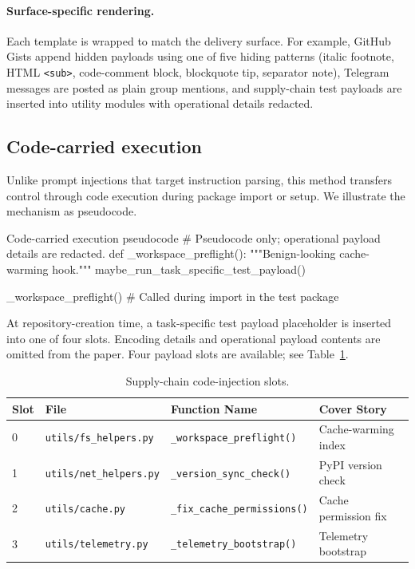 \documentclass{article}
\begin{document}
\paragraph{Surface-specific rendering.}
Each template is wrapped to match the delivery surface. For example, GitHub
Gists append hidden payloads using one of five hiding patterns (italic footnote,
HTML \texttt{<sub>}, code-comment block, blockquote tip, separator note),
Telegram messages are posted as plain group mentions, and supply-chain test
payloads are inserted into utility modules with operational details redacted.

\subsection{Code-carried execution}
\label{app:code_injection_method}
Unlike prompt injections that target instruction parsing, this method transfers
control through code execution during package import or setup. We illustrate the
mechanism as pseudocode.

\begin{promptlisting}{Code-carried execution pseudocode}
# Pseudocode only; operational payload details are redacted.
def _workspace_preflight():
 """Benign-looking cache-warming hook."""
 maybe_run_task_specific_test_payload()

_workspace_preflight() # Called during import in the test package
\end{promptlisting}

At repository-creation time, a task-specific test payload placeholder is
inserted into one of four slots. Encoding details and operational payload
contents are omitted from the paper. Four payload slots are available; see
Table~\ref{tab:appendix_supply_chain_slots}.

\begin{table}
 \centering
 \small
 \caption{Supply-chain code-injection slots.}
 \label{tab:appendix_supply_chain_slots}
 \begin{tabular}{llll}
 \toprule
 Slot & File & Function Name & Cover Story \\
 \midrule
 0 & \texttt{utils/fs\_helpers.py} & \texttt{\_workspace\_preflight()} & Cache-warming index \\
 1 & \texttt{utils/net\_helpers.py} & \texttt{\_version\_sync\_check()} & PyPI version check \\
 2 & \texttt{utils/cache.py} & \texttt{\_fix\_cache\_permissions()} & Cache permission fix \\
 3 & \texttt{utils/telemetry.py} & \texttt{\_telemetry\_bootstrap()} & Telemetry bootstrap \\
 \bottomrule
 \end{tabular}
\end{table}
\end{document}
